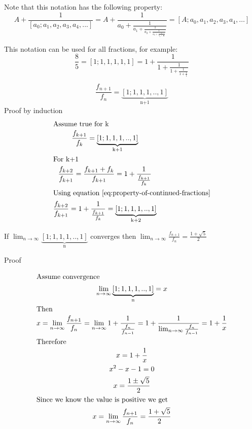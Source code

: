 \documentclass[a4paper]{article}
\begin{document}
Note that this notation has the following property:
\begin{equation}\label{fib:eq:property-of-continued-fractions}
A + \frac{1}{[a_0;a_1,a_2,a_3,a_4, ...]} = A + \frac{1}{a_0 + \frac{1}{a_1 + \frac{1}{a_2 + \frac{1}{a_3 +  \frac{1}{a_4 + \frac{1}{...}}}}}}
= [A; a_0,a_1,a_2,a_3,a_4, \dots]
\end{equation}

This notation can be used for all fractions, for example:
\begin{equation*}
\frac{8}{5} = [1;1,1,1,1, 1] =  1 + \frac{1}{1 + \frac{1}{1 + \frac{1}{1 + \frac{1}{1} }}}
\end{equation*}

\begin{theorem}
\[
\frac{f_{n+1}}{f_{n}} = \underbrace{[1;1,1,1,..,1]}_\text{n+1}
\]
Proof by induction
\begin{gather*}
\shortintertext{Assume true for k}
\frac{f_{k+1}}{f_{k}} = \underbrace{[1;1,1,1,..,1]}_\text{k+1} \\
\shortintertext{For k+1}
\frac{f_{k+2}}{f_{k+1}} = \frac{f_{k+1} + f_{k}}{f_{k+1}} = 1 + \frac{1}{\frac{f_{k+1}}{f_{k}}}
\\
\shortintertext{Using equation~\ref{eq:property-of-continued-fractions}}
\frac{f_{k+2}}{f_{k+1}} = 1 + \frac{1}{\frac{f_{k+1}}{f_{k}}} = \underbrace{[1;1,1,1,..,1]}_\text{k+2}\\
\end{gather*}
\end{theorem}

\begin{theorem}
If $\lim_{n \to \infty} \underbrace{[1;1,1,1,..,1]}_\text{n} $ converges then  $\lim_{n \to \infty} \frac{f_{n+1}}{f_{n}} = \frac{1+ \sqrt{5}}{2} $

Proof

\begin{gather*}
\shortintertext{Assume convergence}
\lim_{n \to \infty} \underbrace{[1;1,1,1,..,1]}_\text{n} = x\\
\shortintertext{Then}
x = \lim_{n \to \infty} \frac{f_{n+1}}{f_{n}} = \lim_{n \to \infty} 1 + \frac{1}{\frac{f_{n}}{f_{n-1}}} =  1 + \frac{1}{ \lim_{n \to \infty} \frac{f_{n}}{f_{n-1}}} = 1 + \frac{1}{x} \\
\shortintertext{Therefore}
x = 1 + \frac{1}{x}\\
x^2 - x  -1 = 0\\
x= \frac{1 \pm \sqrt{5}}{2}\\
\shortintertext{Since we know the value is positive we get}
x = \lim_{n \to \infty} \frac{f_{n+1}}{f_{n}}= \frac{1 + \sqrt{5}}{2}\\
\end{gather*}
\end{theorem}
\end{document}
